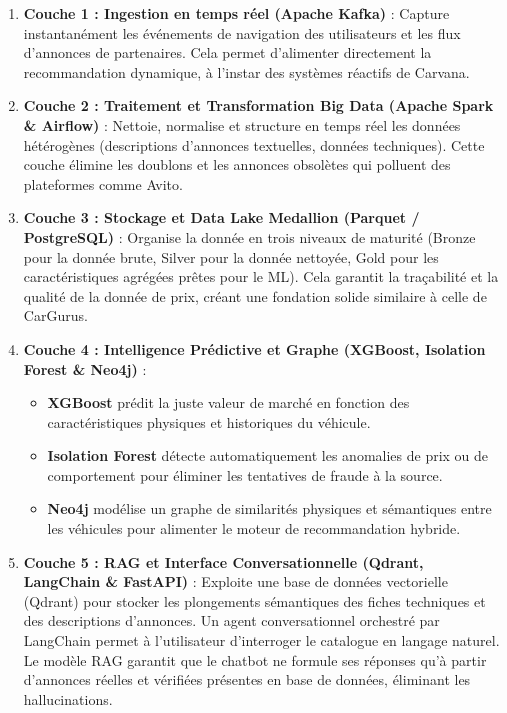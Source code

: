 \documentclass[11pt,a4paper]{article}
\begin{document}
\begin{enumerate}
    \item \textbf{Couche 1 : Ingestion en temps réel (Apache Kafka)} : Capture instantanément les événements de navigation des utilisateurs et les flux d'annonces de partenaires. Cela permet d'alimenter directement la recommandation dynamique, à l'instar des systèmes réactifs de Carvana.
    \item \textbf{Couche 2 : Traitement et Transformation Big Data (Apache Spark \& Airflow)} : Nettoie, normalise et structure en temps réel les données hétérogènes (descriptions d'annonces textuelles, données techniques). Cette couche élimine les doublons et les annonces obsolètes qui polluent des plateformes comme Avito.
    \item \textbf{Couche 3 : Stockage et Data Lake Medallion (Parquet / PostgreSQL)} : Organise la donnée en trois niveaux de maturité (Bronze pour la donnée brute, Silver pour la donnée nettoyée, Gold pour les caractéristiques agrégées prêtes pour le ML). Cela garantit la traçabilité et la qualité de la donnée de prix, créant une fondation solide similaire à celle de CarGurus.
    \item \textbf{Couche 4 : Intelligence Prédictive et Graphe (XGBoost, Isolation Forest \& Neo4j)} : 
    \begin{itemize}
        \item \textbf{XGBoost} prédit la juste valeur de marché en fonction des caractéristiques physiques et historiques du véhicule.
        \item \textbf{Isolation Forest} détecte automatiquement les anomalies de prix ou de comportement pour éliminer les tentatives de fraude à la source.
        \item \textbf{Neo4j} modélise un graphe de similarités physiques et sémantiques entre les véhicules pour alimenter le moteur de recommandation hybride.
    \end{itemize}
    \item \textbf{Couche 5 : RAG et Interface Conversationnelle (Qdrant, LangChain \& FastAPI)} : Exploite une base de données vectorielle (Qdrant) pour stocker les plongements sémantiques des fiches techniques et des descriptions d'annonces. Un agent conversationnel orchestré par LangChain permet à l'utilisateur d'interroger le catalogue en langage naturel. Le modèle RAG garantit que le chatbot ne formule ses réponses qu'à partir d'annonces réelles et vérifiées présentes en base de données, éliminant les hallucinations.
\end{enumerate}
\end{document}
